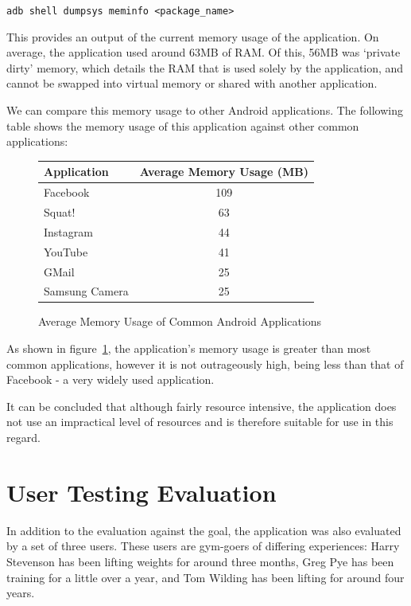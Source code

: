 \texttt{adb shell dumpsys meminfo <package\_name>}

This provides an output of the current memory usage of the application. On average, the application used around 63MB of RAM. Of this, 56MB was `private dirty' memory, which details the RAM that is used solely by the application, and cannot be swapped into virtual memory or shared with another application.

We can compare this memory usage to other Android applications. The following table shows the memory usage of this application against other common applications:

\begin{figure}[H]
    \centering
	\begin{tabular}{ | l | c | }
	    \hline
	    \textbf{Application} & \textbf{Average Memory Usage (MB)} \\ \hline
	    Facebook & 109 \\ \hline
	    Squat! & 63 \\ \hline
	    Instagram & 44 \\ \hline
	    YouTube & 41 \\ \hline
	    GMail & 25 \\ \hline
	    Samsung Camera & 25 \\
	    \hline
    \end{tabular}
\caption{Average Memory Usage of Common Android Applications}
\label{fig:memusage}
\end{figure}

As shown in figure~\ref{fig:memusage}, the application's memory usage is greater than most common applications, however it is not outrageously high, being less than that of Facebook - a very widely used application.

It can be concluded that although fairly resource intensive, the application does not use an impractical level of resources and is therefore suitable for use in this regard.

\section{User Testing Evaluation}
\label{sec:user_testing}
In addition to the evaluation against the goal, the application was also evaluated by a set of three users. These users are gym-goers of differing experiences: Harry Stevenson has been lifting weights for around three months, Greg Pye has been training for a little over a year, and Tom Wilding has been lifting for around four years.

